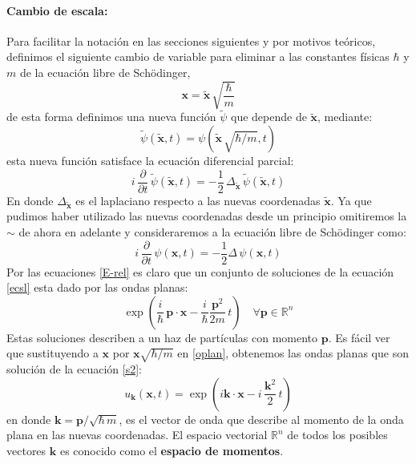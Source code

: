 \documentclass[12pt]{book}
\numberwithin{equation}{chapter}
\def\R{\mathbb{R}}
\def\x{\mathbf{x}}
\def\k{\mathbf{k}}
\def\P{\mathbf{p}}
\begin{document}
\paragraph{Cambio de escala:} 
Para facilitar la notaci\'on en las secciones siguientes y por motivos te\'oricos, definimos el siguiente cambio de variable para eliminar a las constantes f\'isicas $\hbar$ y $m$ de la ecuaci\'on libre de Sch\"odinger,
\begin{equation}
\x = \tilde{\x} \, \sqrt{\frac{\hbar}{m}}
\end{equation}
de esta forma definimos una nueva funci\'on $\tilde{\psi}$ que depende de $\tilde{\x}$, mediante:
\begin{equation}
\tilde{\psi}( \tilde{\x},t)= \psi ( \tilde{\x}\, \sqrt{\hbar / m},t )
\end{equation}
esta nueva funci\'on satisface la ecuaci\'on diferencial parcial:
\begin{equation}
i \, \frac{\partial}{\partial t} \, \tilde{\psi} (\tilde{\x},t)= -\frac{1}{2}\, \Delta_{\tilde{\x}} \, \tilde{\psi} (\tilde{\x},t)
\end{equation}
En donde $\Delta_{\tilde{\x}}$ es el laplaciano respecto a las nuevas coordenadas $\tilde{\x}$. Ya que pudimos haber utilizado las nuevas coordenadas desde un principio omitiremos la $\sim$ de ahora en adelante y consideraremos a la ecuaci\'on libre de Sch\"odinger como:
\begin{equation}\label{s2}
i\, \frac{\partial}{\partial t}\, \psi(\x,t)= -\frac{1}{2} \Delta \, \psi(\x,t)
\end{equation}
Por las ecuaciones \eqref{E-rel} es claro que un conjunto de soluciones de la ecuaci\'on  \eqref{ecsl} esta dado por las ondas planas:
\begin{equation}\label{oplan}
\exp \left( \frac{i}{\hbar}\, \P \cdot \x - \frac{i}{\hbar} \frac{\P^{2}}{2m}\, t \right) \,\,\,\,\,\, \forall \P \in \R^{n}
\end{equation}
Estas soluciones describen a un haz de part\'iculas con momento $\P$. Es f\'acil ver que sustituyendo a $\x$ por $\x \sqrt{\hbar / m}$ en \eqref{oplan}, obtenemos las ondas planas que son soluci\'on de la ecuaci\'on \eqref{s2}:
\begin{equation}
u_{\k}(\x , t)= \exp \left( i\k \cdot \x - i\,\frac{\k^{2}}{2}\, t \right)
\end{equation}
en donde $\k = \P / \sqrt{\hbar \, m}$, es el vector de onda que describe al momento de la onda plana en las nuevas coordenadas. El espacio vectorial $\R^{n}$ de todos los posibles vectores $\k$ es conocido como el {\bf espacio de momentos}.\\
\end{document}
